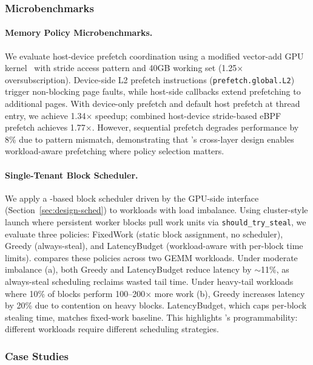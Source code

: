 \subsubsection{Microbenchmarks}

\paragraph{Memory Policy Microbenchmarks.}
We evaluate host-device prefetch coordination using a modified vector-add GPU kernel~\cite{nvidia_cuda_samples} with stride access pattern and 40GB working set (1.25$\times$ oversubscription). Device-side L2 prefetch instructions (\texttt{prefetch.global.L2}) trigger non-blocking page faults, while host-side callbacks extend prefetching to additional pages. With device-only prefetch and default host prefetch at thread entry, we achieve 1.34$\times$ speedup; combined host-device stride-based eBPF prefetch achieves 1.77$\times$. However, sequential prefetch degrades performance by 8\% due to pattern mismatch, demonstrating that \sys's cross-layer design enables workload-aware prefetching where policy selection matters.

\paragraph{Single-Tenant Block Scheduler.}
We apply a \sys-based block scheduler driven by the GPU-side interface (Section~\ref{sec:design-sched}) to workloads with load imbalance. Using cluster-style launch where persistent worker blocks pull work units via \texttt{should\_try\_steal}, we evaluate three policies: FixedWork (static block assignment, no scheduler), Greedy (always-steal), and LatencyBudget (workload-aware with per-block time limits).
 compares these policies across two GEMM workloads. Under moderate imbalance (a), both Greedy and LatencyBudget reduce latency by $\sim$11\%, as always-steal scheduling reclaims wasted tail time. Under heavy-tail workloads where 10\% of blocks perform 100--200$\times$ more work (b), Greedy increases latency by 20\% due to contention on heavy blocks. LatencyBudget, which caps per-block stealing time, matches fixed-work baseline. This highlights \sys's programmability: different workloads require different scheduling strategies.

\subsubsection{Case Studies}

